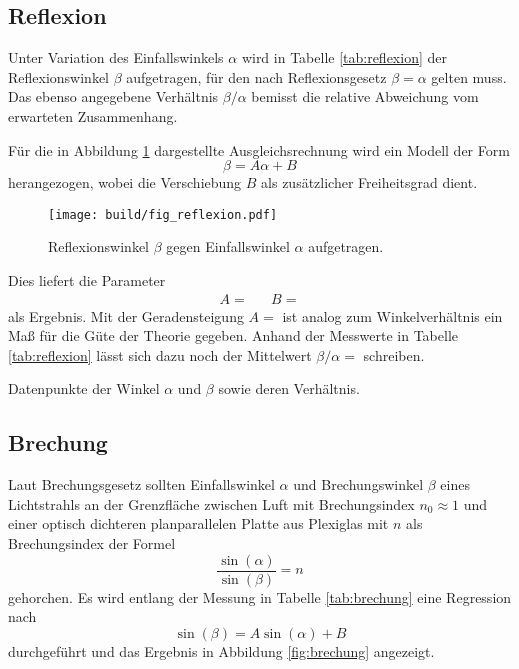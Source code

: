 \subsection{Reflexion}

Unter Variation des Einfallswinkels $\alpha$ wird in Tabelle \ref{tab:reflexion} der Reflexionswinkel $\beta$ aufgetragen, für den nach
Reflexionsgesetz $\beta = \alpha$ gelten muss. Das ebenso angegebene Verhältnis $\beta / \alpha$ bemisst die relative Abweichung vom
erwarteten Zusammenhang.

Für die in Abbildung \ref{fig:reflexion} dargestellte Ausgleichsrechnung wird ein Modell der Form
\begin{equation*}
	\beta = A \alpha + B
\end{equation*}
herangezogen, wobei die Verschiebung $B$ als zusätzlicher Freiheitsgrad dient.

\begin{figure}[H]
	\texttt{[image: build/fig\_reflexion.pdf]}
	\caption{Reflexionswinkel $\beta$ gegen Einfallswinkel $\alpha$ aufgetragen.}
	\label{fig:reflexion}
\end{figure}

Dies liefert die Parameter
\begin{align*}
	A =  && B = 
\end{align*}
als Ergebnis. Mit der Geradensteigung $A = $ ist analog zum Winkelverhältnis ein Maß für die Güte der Theorie gegeben.
Anhand der Messwerte in Tabelle \ref{tab:reflexion} lässt sich dazu noch der Mittelwert $\beta / \alpha = $ schreiben.

\begin{table}[H]
	\centering
	\caption{Datenpunkte der Winkel $\alpha$ und $\beta$ sowie deren Verhältnis.}
	
	\label{tab:reflexion}
\end{table}


\subsection{Brechung}

Laut Brechungsgesetz sollten Einfallswinkel $\alpha$ und Brechungswinkel $\beta$ eines Lichtstrahls an der Grenzfläche zwischen Luft mit
Brechungsindex $n_0 \approx 1$ und einer optisch dichteren planparallelen Platte aus Plexiglas mit $n$ als Brechungsindex der Formel
\begin{equation*}
	\frac{\sin(\alpha)}{\sin(\beta)} = n
\end{equation*}
gehorchen. Es wird entlang der Messung in Tabelle \ref{tab:brechung} eine Regression nach
\begin{equation*}
	\sin(\beta) = A \sin(\alpha) + B
\end{equation*}
durchgeführt und das Ergebnis in Abbildung \ref{fig:brechung} angezeigt.

